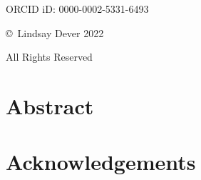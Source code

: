 \documentclass[12pt]{report}
\renewcommand*\contentsname{Table of Contents}
\theoremstyle{definition}
\begin{document}





\clearpage


\thispagestyle{empty}
\begin{center}
	\vspace*{2.5 in} 
	
	ORCID iD: 0000-0002-5331-6493
	
	\copyright $\,$ Lindsay Dever 2022
	
	All Rights Reserved
\end{center}
\clearpage


\chapter*{Abstract}
\doublespacing

\clearpage



\chapter*{Acknowledgements}



\newpage
\renewcommand{\contentsname}{Table of Contents}
\renewcommand{\cfttoctitlefont}{\bfseries}
\begin{center}
\tableofcontents
\end{center}

\newpage 
\renewcommand{\cftloftitlefont}{\bfseries}
\begin{center}
\listoffigures
\end{center}

\newpage
{}








\end{document}
